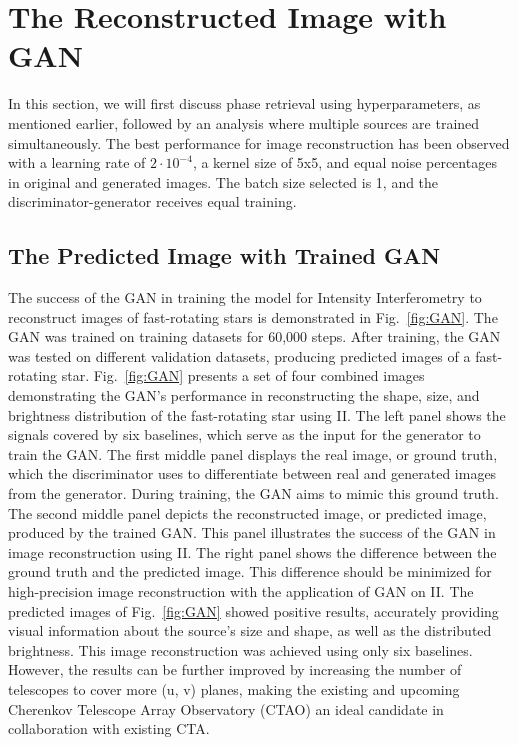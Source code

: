 \section{The Reconstructed Image with GAN}
In this section, we will first discuss phase retrieval using hyperparameters, as mentioned earlier, followed by an analysis where multiple sources are trained simultaneously. The best performance for image reconstruction has been observed with a learning rate of $2 \cdot 10^{-4}$, a kernel size of 5x5, and equal noise percentages in original and generated images. The batch size selected is 1, and the discriminator-generator receives equal training.
\subsection{The Predicted Image with Trained GAN}
The success of the GAN in training the model for Intensity Interferometry to reconstruct images of fast-rotating stars is demonstrated in Fig.~\ref{fig:GAN}. The GAN was trained on training datasets for 60,000 steps. After training, the GAN was tested on different validation datasets, producing predicted images of a fast-rotating star. Fig.~\ref{fig:GAN} presents a set of four combined images demonstrating the GAN's performance in reconstructing the shape, size, and brightness distribution of the fast-rotating star using II. The left panel shows the signals covered by six baselines, which serve as the input for the generator to train the GAN. The first middle panel displays the real image, or ground truth, which the discriminator uses to differentiate between real and generated images from the generator. During training, the GAN aims to mimic this ground truth. The second middle panel depicts the reconstructed image, or predicted image, produced by the trained GAN. This panel illustrates the success of the GAN in image reconstruction using II. The right panel shows the difference between the ground truth and the predicted image. This difference should be minimized for high-precision image reconstruction with the application of GAN on II. The predicted images of Fig.~\ref{fig:GAN} showed positive results, accurately providing visual information about the source's size and shape, as well as the distributed brightness. This image reconstruction was achieved using only six baselines. However, the results can be further improved by increasing the number of telescopes to cover more (u, v) planes, making the existing and upcoming Cherenkov Telescope Array Observatory (CTAO) an ideal candidate in collaboration with existing CTA. 
